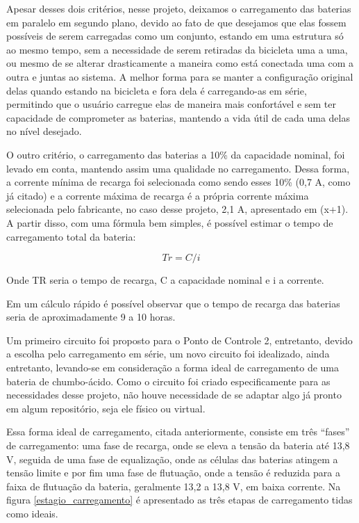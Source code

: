     Apesar desses dois critérios, nesse projeto, deixamos o carregamento das baterias em paralelo em segundo plano, devido ao fato de que desejamos que elas fossem possíveis de serem carregadas como um conjunto, estando em uma estrutura só ao mesmo tempo, sem a necessidade de serem retiradas da bicicleta uma a uma, ou mesmo de se alterar drasticamente a maneira como está conectada uma com a outra e juntas ao sistema. A melhor forma para se manter a configuração original delas quando estando na bicicleta e fora dela é carregando-as em série, permitindo que o usuário carregue elas de maneira mais confortável e sem ter capacidade de comprometer as baterias, mantendo a vida útil de cada uma delas no nível desejado.
	
	O outro critério, o carregamento das baterias a 10\% da capacidade nominal, foi levado em conta, mantendo assim uma qualidade no carregamento. Dessa forma, a corrente mínima de recarga foi selecionada como sendo esses 10\% (0,7 A, como já citado) e a corrente máxima de recarga é a própria corrente máxima selecionada pelo fabricante, no caso desse projeto, 2,1 A, apresentado em (x+1).	
A partir disso, com uma fórmula bem simples, é possível estimar o tempo de carregamento total da bateria:

\begin{equation}
Tr = C/i
\end{equation}

Onde TR seria o tempo de recarga, C a capacidade nominal e i a corrente.

Em um cálculo rápido é possível observar que o tempo de recarga das baterias seria de aproximadamente 9 a 10 horas.

Um primeiro circuito foi proposto para o Ponto de Controle 2, entretanto, devido a escolha pelo carregamento em série, um novo circuito foi idealizado, ainda entretanto, levando-se em consideração a forma ideal de carregamento de uma bateria de chumbo-ácido. Como o circuito foi criado especificamente para as necessidades desse projeto, não houve necessidade de se adaptar algo já pronto em algum repositório, seja ele físico ou virtual.

Essa forma ideal de carregamento, citada anteriormente, consiste em três “fases” de carregamento: uma fase de recarga, onde se eleva a tensão da bateria até 13,8 V, seguida de uma fase de equalização, onde as células das baterias atingem a tensão limite e por fim uma fase de flutuação, onde a tensão é reduzida para a faixa de flutuação da bateria, geralmente 13,2 a 13,8 V, em baixa corrente. Na figura \ref{estagio_carregamento} é apresentado as três etapas de carregamento tidas como ideais.

